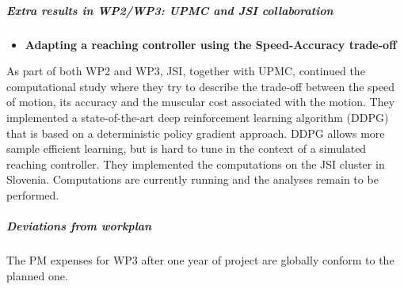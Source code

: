 \subparagraph{Extra results in WP2/WP3: UPMC and JSI collaboration}

\begin{itemize}
\item \textbf{Adapting a reaching controller using the Speed-Accuracy trade-off}
\end{itemize}
As part of both WP2 and WP3, JSI, together with UPMC, continued the computational study where they try to describe the trade-off between the speed of motion, its accuracy and the muscular cost associated with the motion. They implemented a state-of-the-art deep reinforcement learning algorithm (DDPG) that is based on a deterministic policy gradient approach. DDPG allows more sample efficient learning, but is hard to tune in the context of a simulated reaching controller. They implemented the computations on the JSI cluster in Slovenia. Computations are currently running and the analyses remain to be performed.
    
\subparagraph{Deviations from workplan}  

The PM expenses for WP3 after one year of project are globally conform to the planned one.





